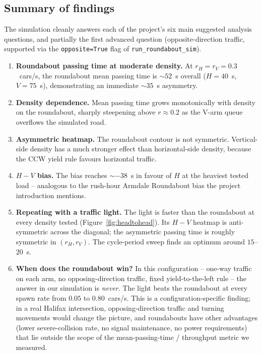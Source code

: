 \documentclass[11pt]{article}
\begin{document}
\subsection{Summary of findings}
The simulation cleanly answers each of the project's six main suggested analysis questions, and partially the first advanced question (opposite-direction traffic, supported via the \texttt{opposite=True} flag of \texttt{run\_roundabout\_sim}).
\begin{enumerate}
    \item \textbf{Roundabout passing time at moderate density.} At $r_H = r_V = 0.3$~cars/s, the roundabout mean passing time is $\sim 52$~s overall ($H = 40$~s, $V = 75$~s), demonstrating an immediate $\sim 35$~s asymmetry.
    \item \textbf{Density dependence.} Mean passing time grows monotonically with density on the roundabout, sharply steepening above $r \approx 0.2$ as the V-arm queue overflows the simulated road.
    \item \textbf{Asymmetric heatmap.} The roundabout contour is not symmetric. Vertical-side density has a much stronger effect than horizontal-side density, because the CCW yield rule favours horizontal traffic.
    \item \textbf{$H - V$ bias.} The bias reaches $\sim -38$~s in favour of $H$ at the heaviest tested load -- analogous to the rush-hour Armdale Roundabout bias the project introduction mentions.
    \item \textbf{Repeating with a traffic light.} The light is faster than the roundabout at every density tested (Figure~\ref{fig:headtohead}). Its $H - V$ heatmap is anti-symmetric across the diagonal; the asymmetric passing time is roughly symmetric in $(r_H, r_V)$. The cycle-period sweep finds an optimum around $15$--$20$~s.
    \item \textbf{When does the roundabout win?} In this configuration -- one-way traffic on each arm, no opposing-direction traffic, fixed yield-to-the-left rule -- the answer in our simulation is \emph{never}. The light beats the roundabout at every spawn rate from $0.05$ to $0.80$~cars/s. This is a configuration-specific finding; in a real Halifax intersection, opposing-direction traffic and turning movements would change the picture, and roundabouts have other advantages (lower severe-collision rate, no signal maintenance, no power requirements) that lie outside the scope of the mean-passing-time / throughput metric we measured.
\end{enumerate}
\end{document}
